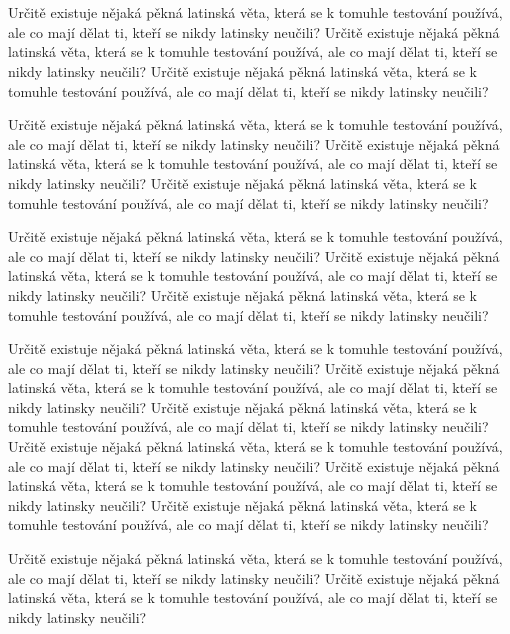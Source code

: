 \documentclass[11pt,twoside,a4paper]{book}
\begin{document}
\section*{}
Určitě existuje nějaká pěkná latinská věta, která se k tomuhle testování používá, ale co mají dělat ti, kteří se nikdy latinsky neučili? Určitě existuje nějaká pěkná latinská věta, která se k tomuhle testování používá, ale co mají dělat ti, kteří se nikdy latinsky neučili? Určitě existuje nějaká pěkná latinská věta, která se k tomuhle testování používá, ale co mají dělat ti, kteří se nikdy latinsky neučili?

Určitě existuje nějaká pěkná latinská věta, která se k tomuhle testování používá, ale co mají dělat ti, kteří se nikdy latinsky neučili? Určitě existuje nějaká pěkná latinská věta, která se k tomuhle testování používá, ale co mají dělat ti, kteří se nikdy latinsky neučili? Určitě existuje nějaká pěkná latinská věta, která se k tomuhle testování používá, ale co mají dělat ti, kteří se nikdy latinsky neučili?

Určitě existuje nějaká pěkná latinská věta, která se k tomuhle testování používá, ale co mají dělat ti, kteří se nikdy latinsky neučili? Určitě existuje nějaká pěkná latinská věta, která se k tomuhle testování používá, ale co mají dělat ti, kteří se nikdy latinsky neučili? Určitě existuje nějaká pěkná latinská věta, která se k tomuhle testování používá, ale co mají dělat ti, kteří se nikdy latinsky neučili?

Určitě existuje nějaká pěkná latinská věta, která se k tomuhle testování používá, ale co mají dělat ti, kteří se nikdy latinsky neučili? Určitě existuje nějaká pěkná latinská věta, která se k tomuhle testování používá, ale co mají dělat ti, kteří se nikdy latinsky neučili? Určitě existuje nějaká pěkná latinská věta, která se k tomuhle testování používá, ale co mají dělat ti, kteří se nikdy latinsky neučili? Určitě existuje nějaká pěkná latinská věta, která se k tomuhle testování používá, ale co mají dělat ti, kteří se nikdy latinsky neučili? Určitě existuje nějaká pěkná latinská věta, která se k tomuhle testování používá, ale co mají dělat ti, kteří se nikdy latinsky neučili? Určitě existuje nějaká pěkná latinská věta, která se k tomuhle testování používá, ale co mají dělat ti, kteří se nikdy latinsky neučili?

Určitě existuje nějaká pěkná latinská věta, která se k tomuhle testování používá, ale co mají dělat ti, kteří se nikdy latinsky neučili? Určitě existuje nějaká pěkná latinská věta, která se k tomuhle testování používá, ale co mají dělat ti, kteří se nikdy latinsky neučili?
\end{document}
